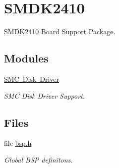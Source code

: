 \hypertarget{group__RTEMSBSPsARMSMDK2410}{}\section{S\+M\+D\+K2410}
\label{group__RTEMSBSPsARMSMDK2410}


S\+M\+D\+K2410 Board Support Package.  


\subsection*{Modules}
\begin{DoxyCompactItemize}
\item 
\mbox{\hyperlink{group__smdk2410__smc}{S\+M\+C Disk Driver}}
\begin{DoxyCompactList}\small\item\em S\+MC Disk Driver Support. \end{DoxyCompactList}\end{DoxyCompactItemize}
\subsection*{Files}
\begin{DoxyCompactItemize}
\item 
file \mbox{\hyperlink{bsps_2arm_2smdk2410_2include_2bsp_8h}{bsp.\+h}}
\begin{DoxyCompactList}\small\item\em Global B\+SP definitons. \end{DoxyCompactList}\end{DoxyCompactItemize}
